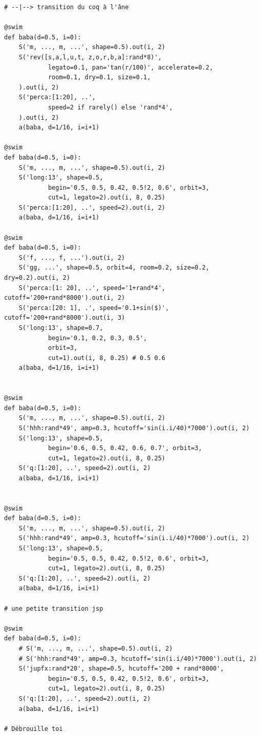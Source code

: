 \documentclass[11pt]{article}
\begin{document}
\begin{enumerate}
\begin{verbatim}
# --|--> transition du coq à l'âne

@swim
def baba(d=0.5, i=0):
    S('m, ..., m, ...', shape=0.5).out(i, 2)
    S('rev([s,a,l,u,t, z,o,r,b,a]:rand*8)',
            legato=0.1, pan='tan(r/100)', accelerate=0.2,
            room=0.1, dry=0.1, size=0.1,
    ).out(i, 2)
    S('perca:[1:20], ..',
            speed=2 if rarely() else 'rand*4',
    ).out(i, 2)
    a(baba, d=1/16, i=i+1)

@swim
def baba(d=0.5, i=0):
    S('m, ..., m, ...', shape=0.5).out(i, 2)
    S('long:13', shape=0.5,
            begin='0.5, 0.5, 0.42, 0.5!2, 0.6', orbit=3,
            cut=1, legato=2).out(i, 8, 0.25)
    S('perca:[1:20], ..', speed=2).out(i, 2)
    a(baba, d=1/16, i=i+1)

@swim
def baba(d=0.5, i=0):
    S('f, ..., f, ...').out(i, 2)
    S('gg, ...', shape=0.5, orbit=4, room=0.2, size=0.2, dry=0.2).out(i, 2)
    S('perca:[1: 20], ..', speed='1+rand*4', cutoff='200+rand*8000').out(i, 2)
    S('perca:[20: 1], .', speed='0.1+sin($)', cutoff='200+rand*8000').out(i, 3)
    S('long:13', shape=0.7,
            begin='0.1, 0.2, 0.3, 0.5',
            orbit=3,
            cut=1).out(i, 8, 0.25) # 0.5 0.6
    a(baba, d=1/16, i=i+1)


@swim
def baba(d=0.5, i=0):
    S('m, ..., m, ...', shape=0.5).out(i, 2)
    S('hhh:rand*49', amp=0.3, hcutoff='sin(i.i/40)*7000').out(i, 2)
    S('long:13', shape=0.5,
            begin='0.6, 0.5, 0.42, 0.6, 0.7', orbit=3,
            cut=1, legato=2).out(i, 8, 0.25)
    S('q:[1:20], ..', speed=2).out(i, 2)
    a(baba, d=1/16, i=i+1)


@swim
def baba(d=0.5, i=0):
    S('m, ..., m, ...', shape=0.5).out(i, 2)
    S('hhh:rand*49', amp=0.3, hcutoff='sin(i.i/40)*7000').out(i, 2)
    S('long:13', shape=0.5,
            begin='0.5, 0.5, 0.42, 0.5!2, 0.6', orbit=3,
            cut=1, legato=2).out(i, 8, 0.25)
    S('q:[1:20], ..', speed=2).out(i, 2)
    a(baba, d=1/16, i=i+1)

# une petite transition jsp

@swim
def baba(d=0.5, i=0):
    # S('m, ..., m, ...', shape=0.5).out(i, 2)
    # S('hhh:rand*49', amp=0.3, hcutoff='sin(i.i/40)*7000').out(i, 2)
    S('jupfx:rand*20', shape=0.5, hcutoff='200 + rand*8000',
            begin='0.5, 0.5, 0.42, 0.5!2, 0.6', orbit=3,
            cut=1, legato=2).out(i, 8, 0.25)
    S('q:[1:20], ..', speed=2).out(i, 2)
    a(baba, d=1/16, i=i+1)

# Débrouille toi



\end{verbatim}
\end{enumerate}
\end{document}

